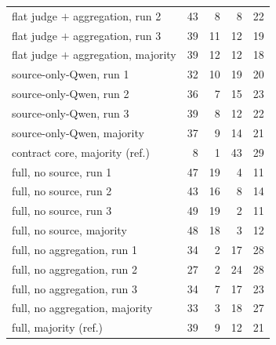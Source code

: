 \documentclass[acmsmall,screen,review,anonymous]{acmart}
\begin{document}
\begin{table}[t]
\begin{tabular}{@{}lrrrr@{}}
flat judge $+$ aggregation, run 2 & 43 & 8 & 8 & 22 \\
flat judge $+$ aggregation, run 3 & 39 & 11 & 12 & 19 \\
flat judge $+$ aggregation, majority & 39 & 12 & 12 & 18 \\
source-only-Qwen, run 1 & 32 & 10 & 19 & 20 \\
source-only-Qwen, run 2 & 36 & 7 & 15 & 23 \\
source-only-Qwen, run 3 & 39 & 8 & 12 & 22 \\
source-only-Qwen, majority & 37 & 9 & 14 & 21 \\
\midrule
contract core, majority (ref.) & 8 & 1 & 43 & 29 \\
\midrule
full, no source, run 1 & 47 & 19 & 4 & 11 \\
full, no source, run 2 & 43 & 16 & 8 & 14 \\
full, no source, run 3 & 49 & 19 & 2 & 11 \\
full, no source, majority & 48 & 18 & 3 & 12 \\
\midrule
full, no aggregation, run 1 & 34 & 2 & 17 & 28 \\
full, no aggregation, run 2 & 27 & 2 & 24 & 28 \\
full, no aggregation, run 3 & 34 & 7 & 17 & 23 \\
full, no aggregation, majority & 33 & 3 & 18 & 27 \\
\midrule
full, majority (ref.) & 39 & 9 & 12 & 21 \\
\bottomrule
\end{tabular}
\end{table}
\end{document}

